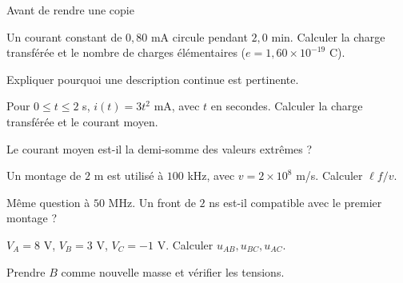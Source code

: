 \begin{docu}{Avant de rendre une copie}
\end{docu}


\begin{questions}
\item Un courant constant de $0{,}80$ mA circule pendant $2{,}0$ min. Calculer la charge transférée et le nombre de charges élémentaires ($e=1{,}60\times10^{-19}$ C).
\item Expliquer pourquoi une description continue est pertinente.
\end{questions}

\begin{questions}
\item Pour $0\leq t\leq2$ s, $i(t)=3t^2$ mA, avec $t$ en secondes. Calculer la charge transférée et le courant moyen.
\item Le courant moyen est-il la demi-somme des valeurs extrêmes ?
\end{questions}

\begin{questions}
\item Un montage de $2$ m est utilisé à $100$ kHz, avec $v=2\times10^8$ m/s. Calculer $\ell f/v$.
\item Même question à $50$ MHz. Un front de $2$ ns est-il compatible avec le premier montage ?
\end{questions}



\begin{questions}
\item $V_A=8$ V, $V_B=3$ V, $V_C=-1$ V. Calculer $u_{AB},u_{BC},u_{AC}$.
\item Prendre $B$ comme nouvelle masse et vérifier les tensions.
\end{questions}

